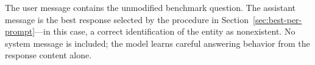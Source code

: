 The user message contains the unmodified benchmark question. The assistant message is the best response selected by the procedure in Section~\ref{sec:best-per-prompt}---in this case, a correct identification of the entity as nonexistent. No system message is included; the model learns careful answering behavior from the response content alone.
